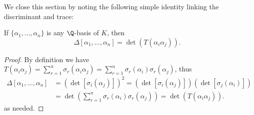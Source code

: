 We close this section by noting the following simple identity linking the
discriminant and trace:
\begin{proposition}\label{discriminant trace}
If $\{\alpha_1,\dots,\alpha_n\}$ is any $\Q$-basis of $K$, then
\[\Delta[\alpha_1,\dots,\alpha_n]=\det(T(\alpha_i\alpha_j)).\]
\end{proposition}
\begin{proof}
By definition we have $T(\alpha_i\alpha_j)=\sum_{r=1}^{n}\sigma_r(\alpha_i\alpha_j)=\sum_{r=1}^{n}\sigma_r(\alpha_i)\sigma_r(\alpha_j)$, thus
\begin{align*}
\Delta[\alpha_1,\dots,\alpha_n]&=(\det[\sigma_i(\alpha_j)])^2=(\det[\sigma_i(\alpha_j)])(\det[\sigma_j(\alpha_i)])\\
&=\det(\sum_{r=1}^{n}\sigma_r(\alpha_i)\sigma_r(\alpha_j))=\det(T(\alpha_i\alpha_j)).
\end{align*}
as needed.
\end{proof}
